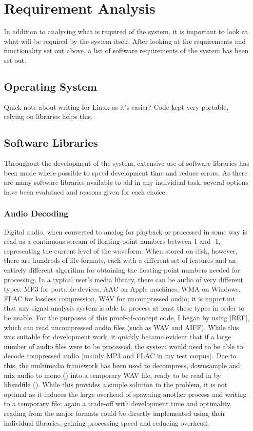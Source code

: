\section{Requirement Analysis}
In addition to analysing what is required of the system, it is important to look at what will be required by the system itself. After looking at the requirements and functionality set out above, a list of software requirements of the system has been set out.
\subsection{Operating System}
Quick note about writing for Linux as it's easier? Code kept very portable, relying on libraries helps this.
\subsection{Software Libraries}
Throughout the development of the system, extensive use of software libraries has been made where possible to speed development time and reduce errors. As there are many software libraries available to aid in any individual task, several options have been evalutaed and reasons given for each choice.
\subsubsection{Audio Decoding}
Digital audio, when converted to analog for playback or processed in some way is read as a continuous stream of floating-point numbers between 1 and -1, representing the current level of the waveform. When stored on disk, however, there are hundreds of file formats, each with a different set of features and an entirely different algorithm for obtaining the floating-point numbers needed for processing. In a typical user's media library, there can be audio of very different types: MP3 for portable devices, AAC on Apple machines, WMA on Windows, FLAC for lossless compression, WAV for uncompressed audio; it is important that any signal analysis system is able to process at least these types in order to be usable. For the purposes of this proof-of-concept code, I began by using [REF], which can read uncompressed audio files (such as WAV and AIFF). While this was suitable for development work, it quickly became evident that if a large number of audio files were to be processed, the system would need to be able to decode compressed audio (mainly MP3 and FLAC in my test corpus). Due to this,  the  multimedia framework has been used to decompress, downsample and mix audio to mono () into a temporary WAV file, ready to be read in by libsndfile (). While this provides a simple solution to the problem, it is not optimal as it induces the large overhead of spawning another process and writing to a temporary file; again a trade-off with development time and optimality, reading from the major formats could be directly implemented using their individual libraries, gaining processing speed and reducing overhead.
